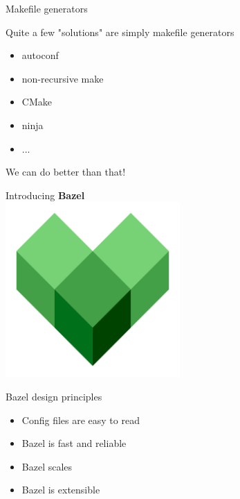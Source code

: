 \documentclass[11pt]{beamer}
\begin{document}
\begin{frame}{Makefile generators}

  Quite a few "solutions" are simply makefile generators

  \begin{itemize}
    \item autoconf
    \item non-recursive make
    \item CMake
    \item ninja
    \item ...
  \end{itemize}

  We can do better than that!

\end{frame}

\begin{frame}[plain]
  \begin{center}
    {\Large Introducing {\bfseries\color{bazelGreen}Bazel}} \\[1cm]
    \includegraphics[width=0.5\textwidth]{images/bazel-icon.pdf}
  \end{center}
\end{frame}

\begin{frame}{Bazel design principles}

  \begin{itemize} \setlength\itemsep{1em}
    \item Config files are easy to read
    \item \alert{Bazel} is fast and reliable
    \item \alert{Bazel} scales
    \item \alert{Bazel} is extensible
  \end{itemize}

  \BazelNavIcon{}
\end{frame}
\end{document}
